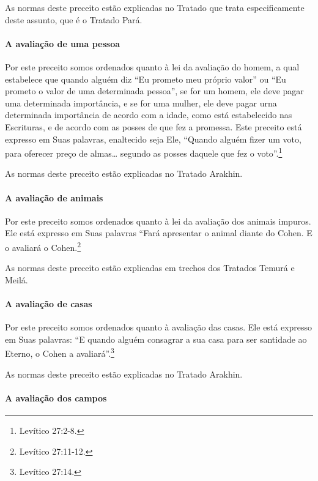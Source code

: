 As normas deste preceito estão explicadas no Tratado que trata
especificamente deste assunto, que é o Tratado Pará.



\paragraph{A avaliação de uma pessoa}

Por este preceito somos ordenados quanto à lei da avaliação do homem, a
qual estabelece que quando alguém diz ``Eu prometo meu próprio valor''
ou ``Eu prometo o valor de uma determinada pessoa'', se for um homem,
ele deve pagar uma determinada importância, e se for uma mulher, ele
deve pagar urna determinada importância de acordo com a idade, como está
estabelecido nas Escrituras, e de acordo com as posses de que fez a
promessa. Este preceito está expresso em Suas palavras, enaltecido seja
Ele, ``Quando alguém fizer um voto, para oferecer preço de almas\ldots{}
segundo as posses daquele que fez o voto''.\footnote{Levítico 27:2-8.}

As normas deste preceito estão explicadas no Tratado Arakhin.


\paragraph{A avaliação de animais}

Por este preceito somos ordenados quanto à lei da avaliação dos animais
impuros. Ele está expresso em Suas palavras ``Fará apresentar o animal
diante do Cohen. E o avaliará o Cohen.\footnote{Levítico 27:11-12.}

As normas deste preceito estão explicadas em trechos dos Tratados Temurá
e Meilá.

\paragraph{A avaliação de casas}

Por este preceito somos ordenados quanto à avaliação das casas. Ele está
expresso em Suas palavras: ``E quando alguém consagrar a sua casa para
ser santidade ao Eterno, o Cohen a avaliará''.\footnote{Levítico 27:14.}

As normas deste preceito estão explicadas no Tratado Arakhin.

\paragraph{A avaliação dos campos}


